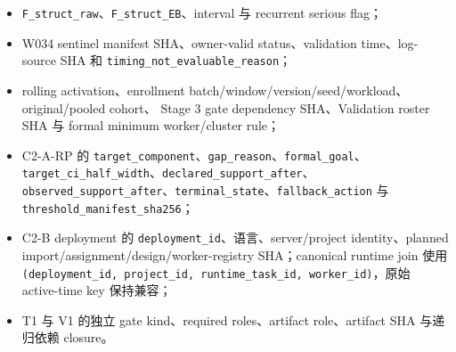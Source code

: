 \begin{itemize}
  stable/multimodal status；不得生成已废止的 \texttt{normalized\_cluster\_margin}；
  \item \texttt{F\_struct\_raw}、\texttt{F\_struct\_EB}、interval 与 recurrent serious flag；
  \item W034 sentinel manifest SHA、owner-valid status、validation time、log-source SHA 和
  \texttt{timing\_not\_evaluable\_reason}；
  \item rolling activation、enrollment batch/window/version/seed/workload、original/pooled cohort、
  Stage 3 gate dependency SHA、Validation roster SHA 与 formal minimum worker/cluster rule；
  \item C2-A-RP 的 \texttt{target\_component}、\texttt{gap\_reason}、\texttt{formal\_goal}、
  \texttt{target\_ci\_half\_width}、\texttt{declared\_support\_after}、
  \texttt{observed\_support\_after}、\texttt{terminal\_state}、\texttt{fallback\_action} 与
  \texttt{threshold\_manifest\_sha256}；
  \item C2-B deployment 的 \texttt{deployment\_id}、语言、server/project identity、planned
  import/assignment/design/worker-registry SHA；canonical runtime join 使用
  \texttt{(deployment\_id, project\_id, runtime\_task\_id, worker\_id)}，原始 active-time key 保持兼容；
  \item T1 与 V1 的独立 gate kind、required roles、artifact role、artifact SHA 与递归依赖 closure。
\end{itemize}
